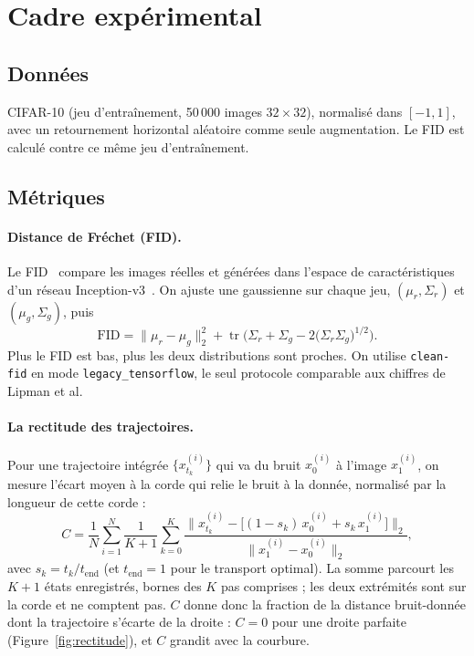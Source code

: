 \documentclass[11pt]{article}
\newcommand{\code}[1]{\texttt{#1}}
\begin{document}
\section{Cadre expérimental}
\label{sec:setup}

\subsection{Données}
CIFAR-10 (jeu d'entraînement, 50\,000 images $32\times32$), normalisé dans $[-1,1]$, avec un retournement
horizontal aléatoire comme seule augmentation. Le FID est calculé contre ce même jeu d'entraînement.

\subsection{Métriques}
\label{sec:metrics}

\paragraph{Distance de Fréchet (FID).}
Le FID~\cite{heusel2017fid} compare les images réelles et générées dans l'espace de caractéristiques d'un
réseau Inception-v3~\cite{szegedy2016inception}. On ajuste une gaussienne sur chaque jeu, $(\mu_r,\Sigma_r)$
et $(\mu_g,\Sigma_g)$, puis
\begin{equation}
\mathrm{FID} = \lVert \mu_r - \mu_g \rVert_2^2 + \operatorname{tr}\!\Big(\Sigma_r + \Sigma_g - 2\big(\Sigma_r \Sigma_g\big)^{1/2}\Big).
\label{eq:fid}
\end{equation}
Plus le FID est bas, plus les deux distributions sont proches. On utilise \code{clean-fid}
\cite{parmar2022cleanfid} en mode \code{legacy\_tensorflow}, le seul protocole comparable aux chiffres de
Lipman et al.

\paragraph{La rectitude des trajectoires.}\label{sec:rectitude}
Pour une trajectoire intégrée $\{x_{t_k}^{(i)}\}$ qui va du bruit $x_0^{(i)}$ à l'image $x_1^{(i)}$, on mesure
l'écart moyen à la corde qui relie le bruit à la donnée, normalisé par la longueur de cette corde :
\begin{equation}
C = \frac{1}{N}\sum_{i=1}^{N} \frac{1}{K+1}\sum_{k=0}^{K} \frac{\big\lVert x_{t_k}^{(i)} - \big[(1-s_k)\,x_0^{(i)} + s_k\,x_1^{(i)}\big]\big\rVert_2}{\big\lVert x_1^{(i)} - x_0^{(i)} \big\rVert_2},
\label{eq:rectitude}
\end{equation}
avec $s_k = t_k/t_{\text{end}}$ (et $t_{\text{end}}=1$ pour le transport optimal). La somme parcourt les
$K+1$ états enregistrés, bornes des $K$ pas comprises ; les deux extrémités sont sur la corde et ne comptent
pas. $C$ donne donc la fraction de la distance bruit-donnée dont la trajectoire s'écarte de la droite :
$C = 0$ pour une droite parfaite (Figure~\ref{fig:rectitude}), et $C$ grandit avec la courbure.
\end{document}
